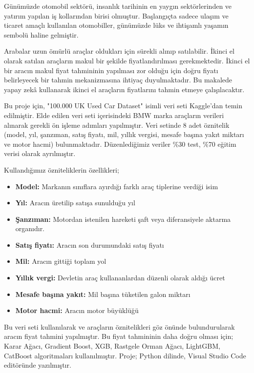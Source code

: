 \documentclass[conference]{IEEEtran}
\begin{document}
\quad Günümüzde otomobil sektörü, insanlık tarihinin en yaygın sektörlerinden ve yatırım yapılan iş kollarından birisi olmuştur. Başlangıçta sadece ulaşım ve ticaret amaçlı kullanılan otomobiller, günümüzde lüks ve ihtişamlı yaşamın sembolü haline gelmiştir\cite{1}.

\quad Arabalar uzun ömürlü araçlar oldukları için sürekli alınıp satılabilir. İkinci el olarak satılan araçların makul bir şekilde fiyatlandırılması gerekmektedir. İkinci el bir aracın makul fiyat tahmininin yapılması zor olduğu için doğru fiyatı belirleyecek bir tahmin mekanizmasına ihtiyaç duyulmaktadır\cite{2}. Bu makalede yapay zekâ kullanarak ikinci el araçların fiyatlarını tahmin etmeye çalışılacaktır.

\quad Bu proje için, "100.000 UK Used Car Dataset" isimli veri seti\cite{3} Kaggle’dan temin edilmiştir. Elde edilen veri seti içerisindeki BMW marka araçların verileri alınarak gerekli ön işleme adımları yapılmıştır. Veri setinde 8 adet öznitelik (model, yıl, şanzıman, satış fiyatı, mil, yıllık vergisi, mesafe başına yakıt miktarı ve motor hacmi) bulunmaktadır. Düzenlediğimiz veriler \%30 test, \%70 eğitim verisi olarak ayrılmıştır.

Kullandığımız özniteliklerin özellikleri;
\begin{itemize}
\item \textbf{Model:} Markanın sınıflara ayırdığı farklı araç tiplerine verdiği isim
\item \textbf{Yıl:} Aracın üretilip satışa sunulduğu yıl
\item \textbf{Şanzıman:} Motordan istenilen hareketi şaft veya diferansiyele aktarma organıdır.
\item \textbf{Satış fiyatı:} Aracın son durumundaki satış fiyatı
\item \textbf{Mil:} Aracın gittiği toplam yol
\item \textbf{Yıllık vergi:} Devletin araç kullananlardan düzenli olarak aldığı ücret
\item \textbf{Mesafe başına yakıt:} Mil başına tüketilen galon miktarı
\item \textbf{Motor hacmi:} Aracın motor büyüklüğü
\end{itemize}

\quad Bu veri seti kullanılarak ve araçların öznitelikleri göz önünde bulundurularak aracın fiyat tahmini yapılmıştır. Bu fiyat tahmininin daha doğru olması için; Karar Ağacı, Gradient Boost, XGB, Rastgele Orman Ağacı, LightGBM, CatBoost algoritmaları kullanılmıştır. Proje; Python dilinde, Visual Studio Code editöründe yazılmıştır.
\end{document}
